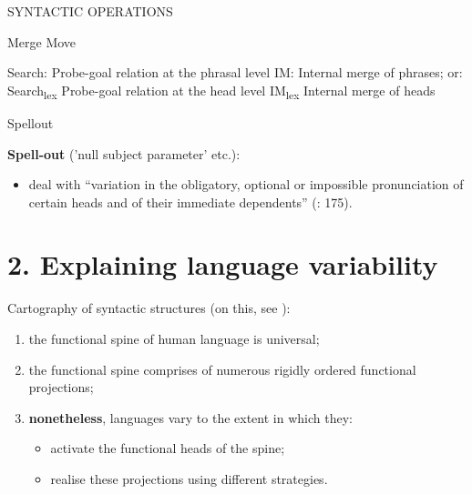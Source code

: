 \documentclass[fleqn,10pt]{wlscirep}
\begin{document}
\begin{exe}
    \ex SYNTACTIC OPERATIONS
        \begin{xlist}
            \ex Merge
            \ex Move
                \begin{xlist}
                    \ex Search:	Probe-goal relation at the phrasal level
                    \ex IM:	Internal merge of phrases; or:
                    \ex Search\textsubscript{lex}	Probe-goal relation at the head level
                    \ex IM\textsubscript{lex}	Internal merge of heads
                \end{xlist}
            \ex Spellout
        \end{xlist}
    \end{exe}

\noindent\textbf{Spell-out} ('null subject parameter' etc.): 
\begin{itemize}
    \item[\ding{227}] \vspace*{-2mm} deal with “variation in the obligatory, optional or impossible pronunciation of certain heads and of their immediate dependents” (\citealt{rizzi2017}: 175). 
\end{itemize}

\section*{2. Explaining language variability}

Cartography of syntactic structures (on this, see \citealt{cinquerizzi2010,rizzicinque2016}):
\begin{enumerate}
    \item \vspace*{-2mm} the functional spine of human language is universal;
    \item \vspace*{-2mm} the functional spine comprises of numerous rigidly ordered functional projections;
    \item \vspace*{-2mm} \textbf{nonetheless}, languages vary to the extent in which they:
        \begin{itemize}
            \item[\ding{227}] \vspace*{-2mm} activate the functional heads of the spine;
            \item[\ding{227}] \vspace*{-2mm} realise these projections using different strategies. 
        \end{itemize}
\end{enumerate}
\end{document}
